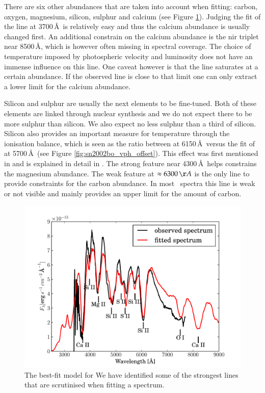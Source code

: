 There are six other abundances that are taken into account when fitting: carbon, oxygen, magnesium, silicon, sulphur and calcium (see Figure \ref{fig:sn2002bo_lineident}). Judging the fit of the  line at 3700\,\AA\ is relatively easy and thus the calcium abundance is usually changed first. An additional constrain on the calcium abundance is the \gls{nir} triplet near 8500\,\AA, which is however often missing in spectral coverage. The choice of temperature imposed by photospheric velocity and luminosity does not have an immense influence on this line. One caveat however is that the  line saturates at a certain abundance. If the observed  line is close to that limit one can only extract a lower limit for the calcium abundance.

Silicon and sulphur are usually the next elements to be fine-tuned. Both of these elements are linked through nuclear synthesis and we do not expect there to be more sulphur than silicon. We also expect no less sulphur than a third of silicon. Silicon also provides an important measure for temperature through the ionisation balance, which is seen as the ratio between  at 6150\,\AA\ versus the fit of  at 5700\,\AA\ (see Figure \ref{fig:sn2002bo_vph_offset}). This effect was first mentioned in \cite{1995ApJ...455L.147N} and is explained in detail in \citep{2008MNRAS.389.1087H}. The strong  feature near 4300\,\AA\ helps constrains the magnesium abundance. The weak  feature at $\approx 6300\,\AA$ is the only line to provide constraints for the carbon abundance. In most \sneia\ spectra this line is weak or not visible and mainly provides an upper limit for the amount of carbon.

\begin{figure}[tb] %
   \centering
   \includegraphics[width=\textwidth, trim=0 0 1cm 0, clip]{chapter_dalek/plots/bf2002bo-10_lineid.pdf} 
   \caption[Best-Fit of SN 2002bo with MLMC including line identification]{The best-fit model for  We have identified some of the strongest lines that are scrutinised when fitting a  spectrum.}
   \label{fig:sn2002bo_lineident}
\end{figure}

